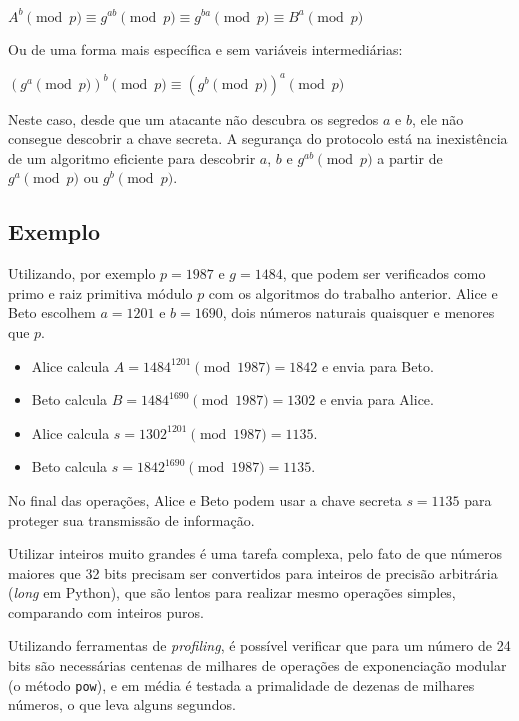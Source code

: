 \documentclass[12pt]{article}
\begin{document}
\begin{center}
    $A^{b} \pmod{p} \equiv g^{ab} \pmod{p} \equiv g^{ba} \pmod{p} \equiv
    B^{a} \pmod{p}$
\end{center}

Ou de uma forma mais específica e sem variáveis intermediárias:

\begin{center}
    $\left(g^{a} \pmod{p}\right)^{b} \pmod{p} \equiv
    \left(g^{b} \pmod{p}\right)^{a} \pmod{p}$
\end{center}

Neste caso, desde que um atacante não descubra os segredos $a$ e $b$, ele não
consegue descobrir a chave secreta. A segurança do protocolo está na
inexistência de um algoritmo eficiente para descobrir $a$, $b$ e
$g^{ab} \pmod{p}$ a partir de $g^{a} \pmod{p}$ ou $g^{b} \pmod{p}$.

\subsection{Exemplo}

Utilizando, por exemplo $p = 1987$ e $g = 1484$, que podem ser verificados como
primo e raiz primitiva módulo $p$ com os algoritmos do trabalho anterior. Alice
e Beto escolhem $a = 1201$ e $b = 1690$, dois números naturais quaisquer e
menores que $p$.

\begin{itemize}
    \item Alice calcula $A = 1484^{1201} \pmod{1987} = 1842$ e envia para Beto.
    \item Beto calcula $B = 1484^{1690} \pmod{1987} = 1302$ e envia para Alice.
    \item Alice calcula $s = 1302^{1201} \pmod{1987} = 1135$.
    \item Beto calcula $s = 1842^{1690} \pmod{1987} = 1135$.
\end{itemize}

No final das operações, Alice e Beto podem usar a chave secreta $s = 1135$ para
proteger sua transmissão de informação.

Utilizar inteiros muito grandes é uma tarefa complexa, pelo fato de que números
maiores que 32 bits precisam ser convertidos para inteiros de precisão
arbitrária (\textit{long} em Python), que são lentos para realizar mesmo
operações simples, comparando com inteiros puros.

Utilizando ferramentas de \textit{profiling}, é possível verificar que para um
número de 24 bits são necessárias centenas de milhares de operações de
exponenciação modular (o método \texttt{pow}), e em média é testada a
primalidade de dezenas de milhares números, o que leva alguns segundos.
\end{document}
